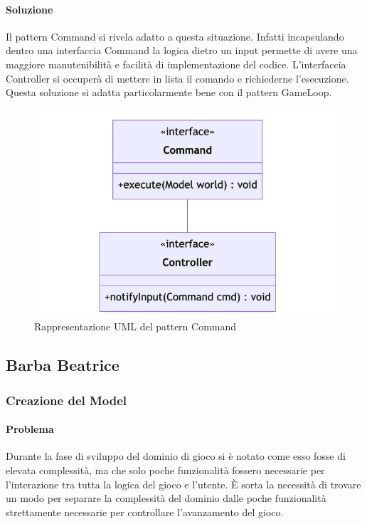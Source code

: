 \documentclass[a4paper,12pt]{report}
\begin{document}
\paragraph{Soluzione} Il pattern Command si rivela adatto a questa situazione. Infatti incapsulando dentro una interfaccia Command la logica dietro un input permette di avere una maggiore manutenibilità e facilità di implementazione del codice. L'interfaccia Controller si occuperà di mettere in lista il comando e richiederne l'esecuzione. Questa soluzione si adatta particolarmente bene con il pattern GameLoop.

\begin{figure}[H]
\centering{}
\includegraphics[width=\textwidth]{img/Diagramma_UML_Command}
\caption{Rappresentazione UML del pattern Command}
\label{img:Diagramma_UML_Command}
\end{figure}

\subsection{Barba Beatrice}

\subsubsection{Creazione del Model}

\paragraph{Problema} Durante la fase di sviluppo del dominio di gioco si è notato come esso fosse di elevata complessità, ma che solo poche funzionalità fossero necessarie per l'interazione tra tutta la logica del gioco e l'utente. È sorta la necessità di trovare un modo per separare la complessità del dominio dalle poche funzionalità strettamente necessarie per controllare l'avanzamento del gioco. 
\end{document}
